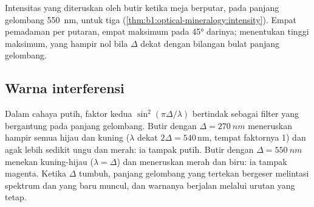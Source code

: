 \begin{omfigure}

{\small Intensitas yang diteruskan oleh butir ketika meja berputar, pada panjang gelombang \qty{550}{nm}, untuk tiga  (\cref{thm:b1:optical-mineralogy:intensity}). Empat pemadaman per putaran, empat maksimum pada \ang{45} darinya;  menentukan tinggi maksimum, yang hampir nol bila $\Delta$ dekat dengan bilangan bulat panjang gelombang.}
\end{omfigure}

\subsection{Warna interferensi}

Dalam cahaya putih, faktor kedua $\sin^2(\pi\Delta/\lambda)$ bertindak sebagai filter yang bergantung pada panjang gelombang. Butir dengan $\Delta = \qty{270}{nm}$ meneruskan hampir semua hijau dan kuning ($\lambda$ dekat $2\Delta = 540$\,nm, tempat faktornya 1) dan agak lebih sedikit ungu dan merah: ia tampak putih. Butir dengan $\Delta = \qty{550}{nm}$ menekan kuning-hijau ($\lambda = \Delta$) dan meneruskan merah dan biru: ia tampak magenta. Ketika $\Delta$ tumbuh, panjang gelombang yang tertekan bergeser melintasi spektrum dan yang baru muncul, dan warnanya berjalan melalui urutan yang tetap.

